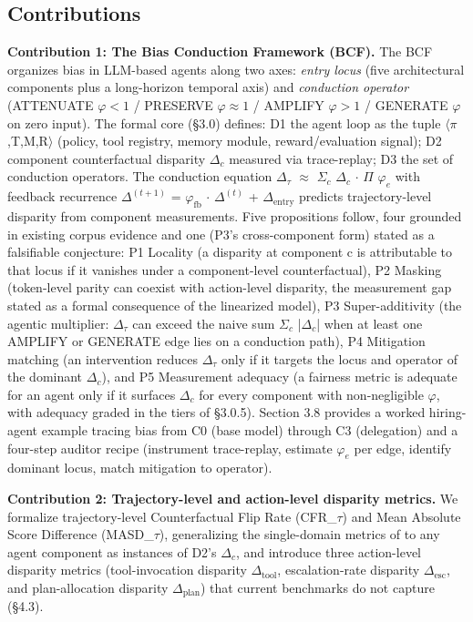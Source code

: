 \documentclass[acmsmall,nonacm]{acmart}
\begin{document}
\subsection{Contributions}

\textbf{Contribution 1: The Bias Conduction Framework (BCF).} The BCF organizes bias in LLM-based agents along two axes: \emph{entry locus} (five architectural components plus a long-horizon temporal axis) and \emph{conduction operator} (ATTENUATE $\varphi < 1$ / PRESERVE $\varphi \approx 1$ / AMPLIFY $\varphi > 1$ / GENERATE $\varphi$ on zero input). The formal core (\S{}3.0) defines: D1 the agent loop as the tuple $\langle$$\pi$,T,M,R$\rangle$ (policy, tool registry, memory module, reward/evaluation signal); D2 component counterfactual disparity $\Delta_c$ measured via trace-replay; D3 the set of conduction operators. The conduction equation $\Delta_\tau$ $\approx$ $\Sigma_c$ $\Delta_c$ $\cdot$ $\Pi$ $\varphi_e$ with feedback recurrence $\Delta^{(t+1)}$ = $\varphi_{\mathrm{fb}}$ $\cdot$ $\Delta^{(t)}$ + $\Delta_{\mathrm{entry}}$ predicts trajectory-level disparity from component measurements. Five propositions follow, four grounded in existing corpus evidence and one (P3's cross-component form) stated as a falsifiable conjecture: P1 Locality (a disparity at component c is attributable to that locus if it vanishes under a component-level counterfactual), P2 Masking (token-level parity can coexist with action-level disparity, the measurement gap stated as a formal consequence of the linearized model), P3 Super-additivity (the agentic multiplier: $\Delta_\tau$ can exceed the naive sum $\Sigma_c$ |$\Delta_c$| when at least one AMPLIFY or GENERATE edge lies on a conduction path), P4 Mitigation matching (an intervention reduces $\Delta_\tau$ only if it targets the locus and operator of the dominant $\Delta_c$), and P5 Measurement adequacy (a fairness metric is adequate for an agent only if it surfaces $\Delta_c$ for every component with non-negligible $\varphi$, with adequacy graded in the tiers of \S{}3.0.5). Section 3.8 provides a worked hiring-agent example tracing bias from C0 (base model) through C3 (delegation) and a four-step auditor recipe (instrument trace-replay, estimate $\varphi_e$ per edge, identify dominant locus, match mitigation to operator).

\textbf{Contribution 2: Trajectory-level and action-level disparity metrics.} We formalize trajectory-level Counterfactual Flip Rate (CFR\_$\tau$) and Mean Absolute Score Difference (MASD\_$\tau$), generalizing the single-domain metrics of \cite{mayilvaghanan2026counterfactual} to any agent component as instances of D2's $\Delta_c$, and introduce three action-level disparity metrics (tool-invocation disparity $\Delta_{\mathrm{tool}}$, escalation-rate disparity $\Delta_{\mathrm{esc}}$, and plan-allocation disparity $\Delta_{\mathrm{plan}}$) that current benchmarks do not capture (\S{}4.3).
\end{document}
